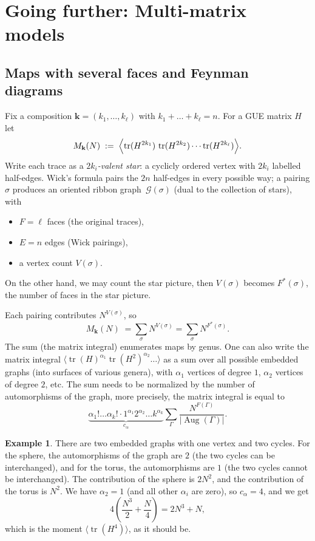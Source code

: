 \documentclass[letterpaper,11pt,oneside,reqno]{article}
\numberwithin{equation}{section}
\theoremstyle{definition}
\newtheorem{example}[proposition]{Example}
\begin{document}
\section{Going further: Multi-matrix models}

\subsection{Maps with several faces and Feynman diagrams}
\label{subsec:feynman-multifaces}

Fix a composition $\mathbf k=(k_1,\dots,k_\ell)$ with
$k_1+\dots+k_\ell=n$.
For a GUE matrix $H$ let
\[
  M_{\mathbf k}(N)
  \;:=\;
  \Bigl\langle
    \operatorname{tr}(H^{2k_1})\,
    \operatorname{tr}(H^{2k_2})\cdots
    \operatorname{tr}(H^{2k_\ell})
  \Bigr\rangle .
\]
Write each trace as a \emph{$2k_i$-valent star}: a cyclicly ordered vertex
with $2k_i$ labelled half-edges.
Wick’s formula pairs the $2n$ half-edges in every possible way; a
pairing $\sigma$ produces an oriented ribbon graph~$\mathcal G(\sigma)$
(dual to the collection of stars),
with
\begin{itemize}
  \item $F=\ell$ faces (the original traces),
  \item $E=n$ edges (Wick pairings),
	\item a vertex count $V(\sigma)$.
\end{itemize}
On the other hand, we may count the star picture, then $V(\sigma)$ becomes
$F^*(\sigma)$, the number of faces in the star picture.

Each pairing contributes $N^{V(\sigma)}$, so
\[
  M_{\mathbf k}(N)\;=\sum_{\sigma} N^{V(\sigma)}=
	\sum_{\sigma} N^{F^*(\sigma)}.
\]
The sum (the matrix integral)
enumerates maps by genus.
One can also write the matrix integral
$\langle \operatorname{tr}(H)^{\alpha_1}\operatorname{tr}(H^2)^{\alpha_2}\ldots  \rangle $
as a sum over
all possible embedded graphs (into surfaces of various genera),
with $\alpha_1$ vertices of degree $1$,
$\alpha_2$ vertices of degree $2$, etc.
The sum needs to be normalized by the number of automorphisms of the graph,
more precisely, the matrix integral is equal to
\begin{equation*}
	\underbrace{\alpha_1!\ldots \alpha_k! \cdot 1^{\alpha_1}2^{\alpha_2}\ldots k^{\alpha_k}}_{c_\alpha}
	\sum_{\Gamma}\frac{N^{F(\Gamma)}}{|\operatorname{Aug}(\Gamma)|}.
\end{equation*}
\begin{example}
	There are two embedded graphs with one vertex and two cycles. For the sphere, the
	automorphisms of the graph are $2$ (the two cycles can be interchanged), and for the torus, the automorphisms are $1$ (the two cycles cannot be interchanged). The contribution of the sphere is $2N^2$, and the contribution of the torus is $N^2$.
	We have $\alpha_2=1$ (and all other $\alpha_i$ are zero), so
	$c_\alpha=4$, and we get
	\[
	4\left(\frac{N^3}{2} + \frac{N}{4}\right) = 2N^3 + N,
	\]
	which is the moment $\langle \operatorname{tr}\left( H^4 \right) \rangle $,
	as it should be.
\end{example}
\end{document}
